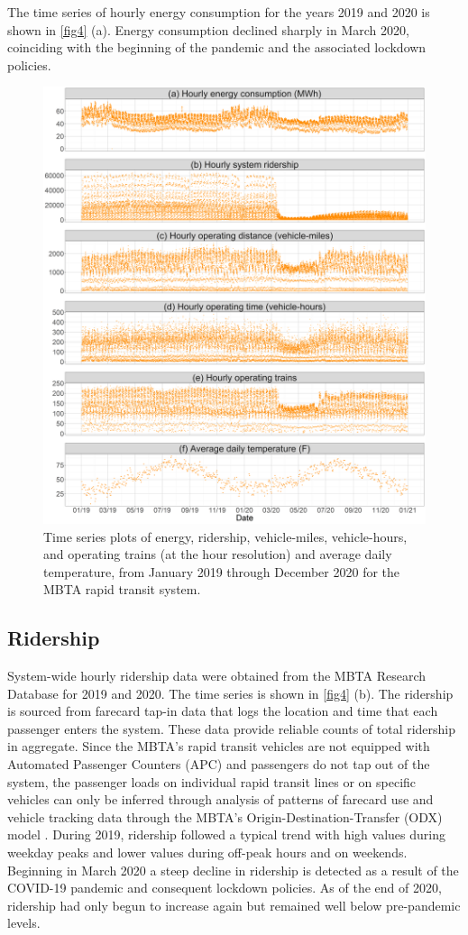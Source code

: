\documentclass[times]{TRR}
\begin{document}
The time series of hourly energy consumption for the years 2019 and 2020 is shown in \autoref{fig4} (a).  Energy consumption declined sharply in March 2020, coinciding with the beginning of the pandemic and the associated lockdown policies.

\begin{figure}[ht!]
    \centering
    \includegraphics[width=.8\textwidth]{Figure_4_Time_series.png}
    \caption{Time series plots of energy, ridership, vehicle-miles, vehicle-hours, and operating trains (at the hour resolution) and average daily temperature, from January 2019 through December 2020 for the MBTA rapid transit system.}
    \label{fig4}
\end{figure}

\subsection{Ridership}
System-wide hourly ridership data were obtained from the MBTA Research Database for 2019 and 2020. The time series is shown in \autoref{fig4} (b).  The ridership is sourced from farecard tap-in data that logs the location and time that each passenger enters the system.  These data provide reliable counts of total ridership in aggregate. Since the MBTA's rapid transit vehicles are not equipped with Automated Passenger Counters (APC) and passengers do not tap out of the system, the passenger loads on individual rapid transit lines or on specific vehicles can only be inferred through analysis of patterns of farecard use and vehicle tracking data through the MBTA's Origin-Destination-Transfer (ODX) model \cite{sanchez-martinez2017inference}. During 2019, ridership followed a typical trend with high values during weekday peaks and lower values during off-peak hours and on weekends.  Beginning in March 2020 a steep decline in ridership is detected as a result of the COVID-19 pandemic and consequent lockdown policies.  As of the end of 2020, ridership had only begun to increase again but remained well below pre-pandemic levels.
\end{document}
